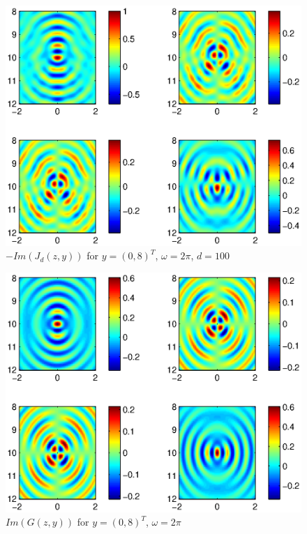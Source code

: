 \begin{figure}[htbp]
	\centering
	\includegraphics[width=\textwidth]{./Img/graphic/psf_om_2_lm_5_mu_25_im.eps}	
	\caption{$-Im(J_d(z,y))$ for $y=(0,8)^T$, $\omega=2\pi$, $d=100$}\label{figure_green}
\end{figure}
\begin{figure}[htbp]
	\centering
	\includegraphics[width=\textwidth]{./Img/graphic/green_om_2_lm_5_mu_25_im.eps}	
	\caption{$Im(G(z,y))$ for $y=(0,8)^T$, $\omega=2\pi$}\label{figure_psf}
\end{figure}

